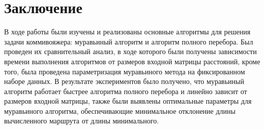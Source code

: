 \documentclass[a4paper,12pt]{report}
\begin{document}
\newpage

\chapter*{Заключение}
\hspace{0.6cm}В ходе работы были изучены и реализованы основные алгоритмы для решения задачи коммивояжера: муравьиный алгоритм и алгоритм полного перебора. Был проведен их сравнительный анализ, в ходе которого были получены зависимости времени выполнения алгоритмов от размеров входной матрицы расстояний, кроме того, была проведена параметризация муравьиного метода на фиксированном наборе данных. В результате экспериментов было получено, что муравьиный алгоритм работает быстрее алгоритма полного перебора и линейно зависит от размеров входной матрицы, также были выявлены оптимальные параметры для муравьиного алгоритма, обеспечивающие минимальное отклонение длины вычисленного маршрута от длины минимального.
  
\end{document}
